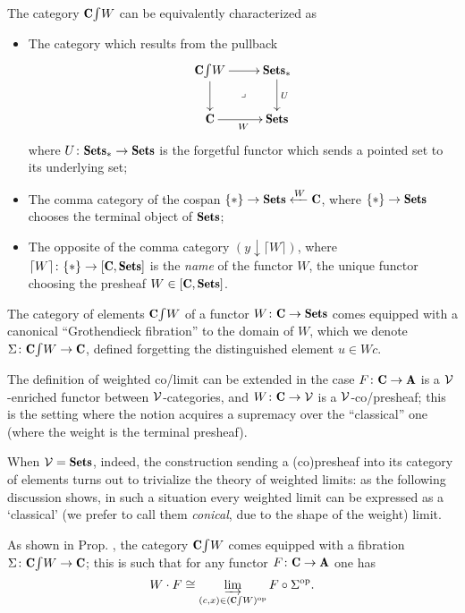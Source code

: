 \documentclass[a4paper,12pt]{amsart}
\def\yon{y}
\begin{document}
\begin{proposition}
The category $\elts{\C}{W}$ can be equivalently characterized as
\begin{itemize}
\item The category which results from the pullback 
\[
\xymatrix{
  \elts{\C}{W}\ar[r]\ar[d]\ar@{}[dr]|\lrcorner & \Sets_* \ar[d]^U \\
  \C \ar[r]_W & \Sets
}
\]
where $U\colon \Sets_*\to\Sets$ is the forgetful functor which sends a pointed set to its underlying set;
\item The comma category of the cospan $\{*\}\to \Sets \xot{W} \C$, where $\{*\}\to \Sets$ chooses the terminal object of $\Sets$;
\item The opposite of the comma category $(\yon\downarrow \lceil W\rceil)$, where $\lceil W\rceil\colon \{*\}\to [\C, \Sets]$ is the \emph{name} of the functor $W$, \ie the unique functor choosing the presheaf $W\in [\C, \Sets]$.
\end{itemize}
\end{proposition}
\begin{proposition}\label{fibelem}
The category of elements $\elts{\C}{W}$ of a functor $W\colon \C\to \Sets$ comes equipped with a canonical ``Grothendieck fibration'' to the domain of $W$, which we denote $\Sigma\colon \elts{\C}{W}\to \C$, defined forgetting the distinguished element $u\in Wc$. 
\end{proposition}
\begin{remark}
The definition of weighted co/limit can be extended in the case $F\colon \C\to\A$ is a $\mathcal{V}$-enriched functor between $\mathcal{V}$-categories, and $W\colon \C\to\V$ is a $\mathcal{V}$-co/presheaf; this is the setting where the notion acquires a supremacy over the ``classical'' one (where the weight is the terminal presheaf). 

When $\V=\Sets$, indeed, the construction sending a (co)presheaf into its category of elements turns out to trivialize the theory of weighted limits: as the following discussion shows, in such a situation every weighted limit can be expressed as a `classical' (we prefer to call them \emph{conical}, due to the shape of the weight) limit.
\end{remark}
\begin{proposition}\label{elementi}
As shown in Prop\@. , the category $\elts{\C}{W}$ comes equipped with a fibration $\Sigma\colon \elts{\C}{W}\to\C$; this is such that for any functor $F\colon \C\to \A$ one has 
\[
W\cdot F\cong \varinjlim_{(c,x)\in (\elts{\C}{W})^\opp} F\circ \Sigma^\opp.\]
\end{proposition}
\end{document}
